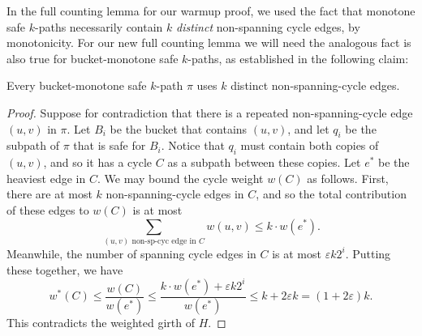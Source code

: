 \documentclass{theoretics}
\newcommand{\eps}{\varepsilon}
\begin{document}
In the full counting lemma for our warmup proof, we used the fact that monotone safe $k$-paths necessarily contain $k$ \emph{distinct} non-spanning cycle edges, by monotonicity.
For our new full counting lemma we will need the analogous fact is also true for bucket-monotone safe $k$-paths, as established in the following claim:
\begin{claim} \label{clm:bmsdistinct}
Every bucket-monotone safe $k$-path $\pi$ uses $k$ distinct non-spanning-cycle edges.
\end{claim}
\begin{proof}
Suppose for contradiction that there is a repeated non-spanning-cycle edge $(u, v)$ in $\pi$.
Let $B_i$ be the bucket that contains $(u, v)$, and let $q_i$ be the subpath of $\pi$ that is safe for $B_i$.
Notice that $q_i$ must contain both copies of $(u, v)$, and so it has a cycle $C$ as a subpath between these copies.
Let $e^*$ be the heaviest edge in $C$.
We may bound the cycle weight $w(C)$ as follows.
First, there are at most $k$ non-spanning-cycle edges in $C$, and so the total contribution of these edges to $w(C)$ is at most
$$\sum \limits_{(u, v) \text{ non-sp-cyc edge in } C} w(u, v) \le k \cdot w(e^*).$$
Meanwhile, the number of spanning cycle edges in $C$ is at most $\eps k 2^i$.
Putting these together, we have
$$w^*(C) \le \frac{w(C)}{w(e^*)} \le \frac{k \cdot w(e^*) + \eps k 2^i}{w(e^*)} \le k + 2 \eps k = (1 + 2\eps) k.$$
This contradicts the weighted girth of $H$.
\end{proof}
\end{document}
